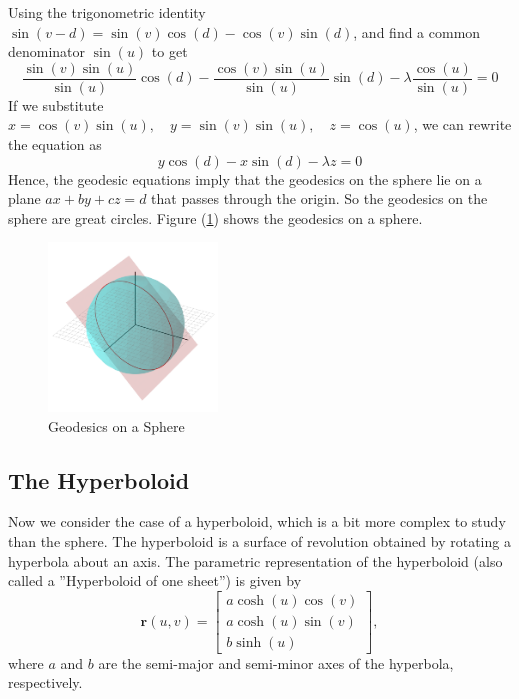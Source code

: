 \documentclass[12pt]{article}
\begin{document}
Using the trigonometric identity \(\sin(v - d) = \sin(v)\cos(d) - \cos(v)\sin(d)\),  and find a common denominator $\sin(u)$ to get
\[
    \frac{\sin(v)\sin(u)}{\sin(u)}\cos(d) - \frac{\cos(v)\sin(u)}{\sin(u)}\sin(d) - \lambda \frac{\cos(u)}{\sin(u)} = 0
\]
If we substitute \(x = \cos(v)\sin(u), \quad y = \sin(v)\sin(u), \quad z = \cos(u)\), we can rewrite the equation as
\[
    y\cos(d) - x\sin(d) - \lambda z = 0
\]
Hence, the geodesic equations imply that the geodesics on the sphere lie on a plane \( ax + by + cz = d \) that passes through the origin.
So the geodesics on the sphere are great circles. Figure (\ref{fig:geodesics-on-sphere}) shows the geodesics on a sphere.

\begin{figure}[ht]
	\centering
	\includegraphics[width=0.4\textwidth]{images/output.png}
	\caption{Geodesics on a Sphere}
	\label{fig:geodesics-on-sphere}
\end{figure}

\subsection{The Hyperboloid}

Now we consider the case of a hyperboloid, which is a bit more complex to study than the sphere.
The hyperboloid is a surface of revolution obtained by rotating a hyperbola about an axis.
The parametric representation of the hyperboloid (also called a ”Hyperboloid of one sheet”) is given by
\[
    \mathbf{r}(u, v) = \begin{bmatrix} a \cosh (u) \cos (v) \\ a \cosh (u) \sin (v) \\ b \sinh (u) \end{bmatrix},
\]
where \(a\) and \(b\) are the semi-major and semi-minor axes of the hyperbola, respectively.
\end{document}
